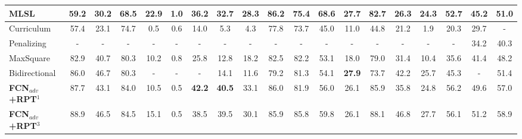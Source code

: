 \documentclass[10pt,twocolumn,letterpaper]{article}
\begin{document}
\begin{table*}[]
\begin{tabular}{l@{~}|@{~}c@{~~}c@{~~}c@{~~}c@{~~}c@{~~}c@{~~}c@{~~}c@{~~}c@{~~}c@{~~}c@{~~}c@{~~}c@{~~}c@{~~}c@{~~}c@{~}|@{~}c@{~~}c@{~}}
   MLSL~\cite{iqbal2019mlsl}                    & 59.2          & 30.2          & 68.5          & \textbf{22.9} & 1.0          & 36.2          & 32.7          & 28.3          & \textbf{86.2} & 75.4          & \textbf{68.6} & 27.7          & 82.7          & 26.3          & 24.3          & 52.7          & 45.2          & 51.0          \\ \hline
   Curriculum~\cite{zhang2017curriculum}        & 57.4          & 23.1          & 74.7          & 0.5           & 0.6          & 14.0          & 5.3           & 4.3           & 77.8          & 73.7          & 45.0          & 11.0          & 44.8          & 21.2          & 1.9           & 20.3          & 29.7          & -             \\
   Penalizing~\cite{zhu2018penalizing}          & -             & -             & -             & -             & -            & -             & -             & -             & -             & -             & -             & -             & -             & -             & -             & -             & 34.2          & 40.3          \\
   MaxSquare~\cite{Chen_2019_ICCV}              & 82.9          & 40.7          & 80.3          & 10.2          & 0.8          & 25.8          & 12.8          & 18.2          & 82.5          & 82.2          & 53.1          & 18.0          & 79.0          & 31.4          & 10.4          & 35.6          & 41.4          & 48.2          \\
   Bidirectional~\cite{li2019bidirectional}     & 86.0          & 46.7          & 80.3          & -             & -            & -             & 14.1          & 11.6          & 79.2          & 81.3          & 54.1          & \textbf{27.9} & 73.7          & 42.2          & 25.7          & 45.3          & -             & 51.4          \\   \hline\hline
   \textbf{FCN$_{adv}$+RPT$^{1}$}                                  & 87.7          & 43.1          & 84.0          & 10.5          & 0.5          & \textbf{42.2} & \textbf{40.5} & 33.1          & 86.0          & 81.9          & 56.0          & 26.1          & 85.9          & 35.8          & 24.8          & 56.2          & 49.6          & 57.0        \\
   \textbf{FCN$_{adv}$+RPT$^{3}$}                                  & 88.9          & 46.5          & 84.5          & 15.1          & 0.5          & 38.5          & 39.5          & 30.1          & 85.9          & 85.8          & 59.8          & 26.1          & 88.1          & 46.8          & 27.7          & 56.1          & 51.2          & 58.9         \\

\end{tabular}
\end{table*}
\end{document}
